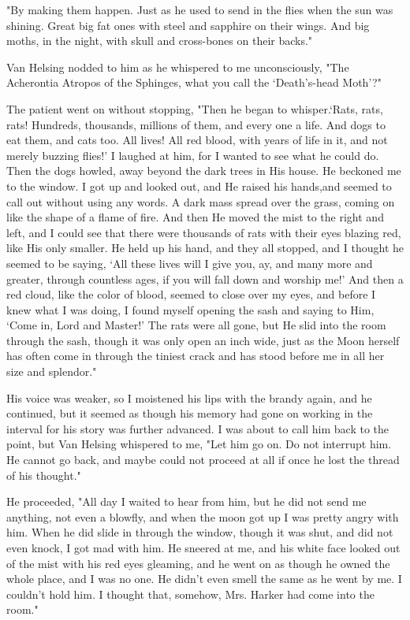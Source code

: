 "By making them happen. Just as he used to send in the flies when the sun was shining. Great big fat ones with steel and sapphire on their wings. And big moths, in the night, with skull and cross-bones on their backs." 

Van Helsing nodded to him as he whispered to me unconsciously, "The Acherontia Atropos of the Sphinges, what you call the `Death's-head Moth'?" 

The patient went on without stopping, "Then he began to whisper.`Rats, rats, rats! Hundreds, thousands, millions of them, and every one a life. And dogs to eat them, and cats too. All lives! All red blood, with years of life in it, and not merely buzzing flies!' I laughed at him, for I wanted to see what he could do. Then the dogs howled, away beyond the dark trees in His house. He beckoned me to the window. I got up and looked out, and He raised his hands,and seemed to call out without using any words. A dark mass spread over the grass, coming on like the shape of a flame of fire. And then He moved the mist to the right and left, and I could see that there were thousands of rats with their eyes blazing red, like His only smaller. He held up his hand, and they all stopped, and I thought he seemed to be saying, `All these lives will I give you, ay, and many more and greater, through countless ages, if you will fall down and worship me!' And then a red cloud, like the color of blood, seemed to close over my eyes, and before I knew what I was doing, I found myself opening the sash and saying to Him, `Come in, Lord and Master!' The rats were all gone, but He slid into the room through the sash, though it was only open an inch wide, just as the Moon herself has often come in through the tiniest crack and has stood before me in all her size and splendor." 

His voice was weaker, so I moistened his lips with the brandy again, and he continued, but it seemed as though his memory had gone on working in the interval for his story was further advanced. I was about to call him back to the point, but Van Helsing whispered to me, "Let him go on. Do not interrupt him. He cannot go back, and maybe could not proceed at all if once he lost the thread of his thought." 

He proceeded, "All day I waited to hear from him, but he did not send me anything, not even a blowfly, and when the moon got up I was pretty angry with him. When he did slide in through the window, though it was shut, and did not even knock, I got mad with him. He sneered at me, and his white face looked out of the mist with his red eyes gleaming, and he went on as though he owned the whole place, and I was no one. He didn't even smell the same as he went by me. I couldn't hold him. I thought that, somehow, Mrs. Harker had come into the room." 

